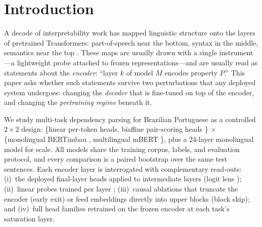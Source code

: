 \documentclass[letterpaper]{article}
\begin{document}
\section{Introduction}

A decade of interpretability work has mapped linguistic structure onto the
layers of pretrained Transformers: part-of-speech near the bottom, syntax in
the middle, semantics near the top \cite{tenney2019bert,rogers2020primer}.
These maps are usually drawn with a single instrument---a lightweight probe
attached to frozen representations---and are usually read as statements about
the \emph{encoder}: ``layer $k$ of model $M$ encodes property $P$.'' This
paper asks whether such statements survive two perturbations that any deployed
system undergoes: changing the \emph{decoder} that is fine-tuned on top of the
encoder, and changing the \emph{pretraining regime} beneath it.

We study multi-task dependency parsing for Brazilian Portuguese as a
controlled $2 \times 2$ design: \{linear per-token heads, biaffine
pair-scoring heads \cite{dozat2017biaffine}\} $\times$ \{monolingual
BERTimbau \cite{souza2020bertimbau}, multilingual mBERT
\cite{devlin2019bert}\}, plus a 24-layer monolingual model for scale. All
models share the training corpus, labels, and evaluation protocol, and every
comparison is a paired bootstrap over the same test sentences. Each encoder
layer is interrogated with complementary read-outs: (i)~the deployed
final-layer heads applied to intermediate layers (logit lens
\cite{nostalgebraist2020logitlens}); (ii)~linear probes trained per layer
\cite{hewitt2019structural,belinkov2022probing}; (iii)~causal ablations that
truncate the encoder (early exit) or feed embeddings directly into upper
blocks (block skip); and (iv)~full head families retrained on the frozen
encoder at each task's saturation layer.
\end{document}
